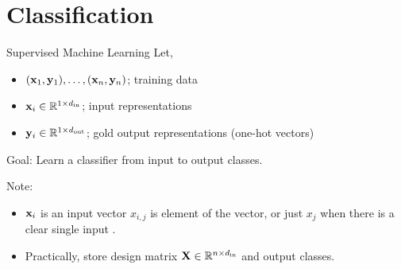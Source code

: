 \documentclass{beamer}
\begin{document}





\section{Classification}


\begin{frame}{Supervised Machine Learning}
  Let, 
  \begin{itemize}
  \item $(\mathbf{x}_1, \mathbf{y}_1), \ldots, (\mathbf{x}_n, \mathbf{y}_n)$; training data
  \item $\mathbf{x}_i \in \mathbb{R}^{1 \times {d_{\mathrm{in}}}}$;  input representations  
  \item $\mathbf{y}_i \in \mathbb{R}^{1 \times {d_{\mathrm{out}}}}$; gold output representations (one-hot vectors)
  \end{itemize}

  Goal: Learn a classifier from input to output classes.  

  \air
  \air

  Note:
  \begin{itemize}
  \item $\mathbf{x}_i$ is an input vector $x_{i, j}$ is element of the vector, or just $x_j$ when there is a clear single input .
  \item Practically, store design matrix $\mathbf{X} \in \mathbb{R}^{n    \times {d_{\mathrm{in}}}}$ and output classes.
  \end{itemize}


\end{frame}
\end{document}
